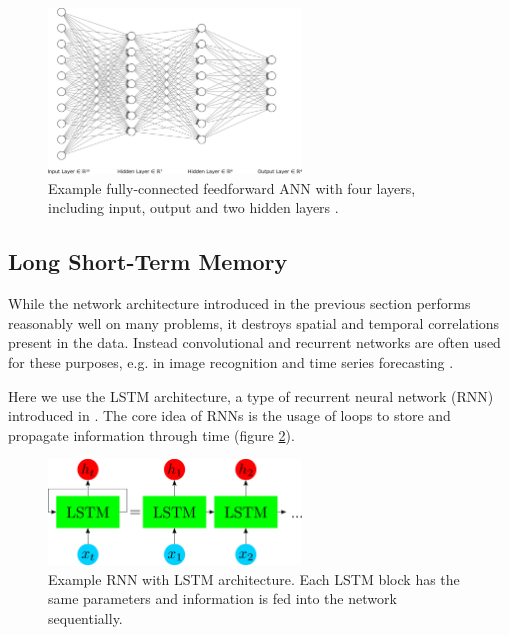 \begin{figure}
	\centering
	\includegraphics[width=0.6\textwidth]{img/nn}
	\caption{Example fully-connected feedforward ANN with four layers, including input, output and two hidden layers \cite{LeNail2019}.}
	\label{nn}
\end{figure}

\subsection{Long Short-Term Memory}
While the network architecture introduced in the previous section performs reasonably well on many problems, it destroys spatial and temporal correlations present in the data. 
Instead convolutional and recurrent networks are often used for these purposes, e.g. in image recognition and time series forecasting \cite{rumelhart1986learning, 10.1007/978-3-642-46466-9_18}.

Here we use the LSTM architecture, a type of recurrent neural network (RNN) introduced in \cite{doi:10.1162/neco.1997.9.8.1735}. 
The core idea of RNNs is the usage of loops to store and propagate information through time (figure \ref{rnn}).

\begin{figure}
	\centering
	\includegraphics[width=0.6\textwidth]{img/rnn}
	\caption{Example RNN with LSTM architecture. Each LSTM block has the same parameters and information is fed into the network sequentially.}
	\label{rnn}
\end{figure}

